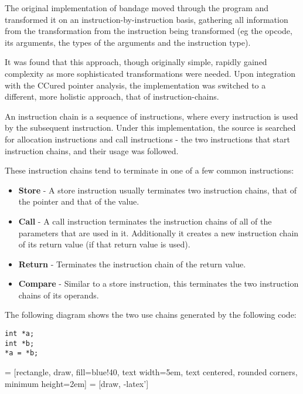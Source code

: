 The original implementation of bandage moved through the program and transformed it on an instruction-by-instruction basis, gathering all information from the transformation from the instruction being transformed (eg the opcode, its arguments, the types of the arguments and the instruction type).

It was found that this approach, though originally simple, rapidly gained complexity as more sophisticated transformations were needed.
Upon integration with the CCured pointer analysis, the implementation was switched to a different, more holistic approach, that of instruction-chains.

An instruction chain is a sequence of instructions, where every instruction is used by the subsequent instruction.
Under this implementation, the source is searched for allocation instructions and call instructions - the two instructions that start instruction chains, and their usage was followed.

These instruction chains tend to terminate in one of a few common instructions:

\begin{itemize}
\item \textbf{Store} - A store instruction usually terminates two instruction chains, that of the pointer and that of the value.
\item \textbf{Call} - A call instruction terminates the instruction chains of all of the parameters that are used in it. Additionally it creates a new instruction chain of its return value (if that return value is used).
\item \textbf{Return} - Terminates the instruction chain of the return value.
\item \textbf{Compare} - Similar to a store instruction, this terminates the two instruction chains of its operands.
\end{itemize}

The following diagram shows the two use chains generated by the following code:

\begin{verbatim}
int *a;
int *b;
*a = *b;
\end{verbatim}
 = [rectangle, draw, fill=blue!40, 
    text width=5em, text centered, rounded corners, minimum height=2em]
 = [draw, -latex']

